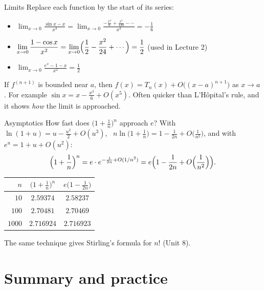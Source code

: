 \documentclass[10pt]{wosm-slides}
\begin{document}
\begin{frame}{Limits}
  Replace each function by the start of its series:
  \begin{itemize}
    \item $\displaystyle\lim_{x\to0} \frac{\sin x - x}{x^3}
      = \lim_{x\to0} \frac{-\frac{x^3}{6} + \frac{x^5}{120} - \cdots}{x^3} = -\frac16$
    \item $\displaystyle\lim_{x\to0} \frac{1 - \cos x}{x^2}
      = \lim_{x\to0} \Bigl(\frac12 - \frac{x^2}{24} + \cdots\Bigr) = \frac12$
      \quad (used in Lecture 2)
    \item $\displaystyle\lim_{x\to0} \frac{e^x - 1 - x}{x^2} = \frac12$
  \end{itemize}
  \pause
  \begin{remark}[$O$-notation]
    If $f^{(n+1)}$ is bounded near $a$, then $f(x) = T_n(x) + O\bigl((x-a)^{n+1}\bigr)$ as
    $x \to a$. For example $\sin x = x - \frac{x^3}{6} + O(x^5)$.
    Often quicker than L'H\^opital's rule, and it shows \emph{how} the limit is approached.
  \end{remark}
\end{frame}

\begin{frame}{Asymptotics}
  How fast does $\bigl(1 + \frac1n\bigr)^n$ approach $e$? With $\ln(1 + u) = u - \frac{u^2}{2} + O(u^3)$,
  \ $n \ln\bigl(1 + \frac1n\bigr) = 1 - \frac{1}{2n} + O\bigl(\frac{1}{n^2}\bigr)$, and with
  $e^u = 1 + u + O(u^2)$:
  \[ \Bigl(1 + \frac1n\Bigr)^n = e \cdot e^{-\frac{1}{2n} + O(1/n^2)}
     = e \Bigl(1 - \frac{1}{2n} + O\Bigl(\frac{1}{n^2}\Bigr)\Bigr) . \]
  \pause
  \begin{center}
  \small
  \begin{tabular}{rcc}
    \toprule
    $n$ & $\bigl(1 + \frac1n\bigr)^n$ & $e \bigl(1 - \frac{1}{2n}\bigr)$ \\
    \midrule
    $10$   & $2.59374$  & $2.58237$ \\
    $100$  & $2.70481$  & $2.70469$ \\
    $1000$ & $2.716924$ & $2.716923$ \\
    \bottomrule
  \end{tabular}
  \end{center}
  {\small The same technique gives Stirling's formula for $n!$ (Unit 8).\par}
\end{frame}

\section{Summary and practice}
\end{document}
